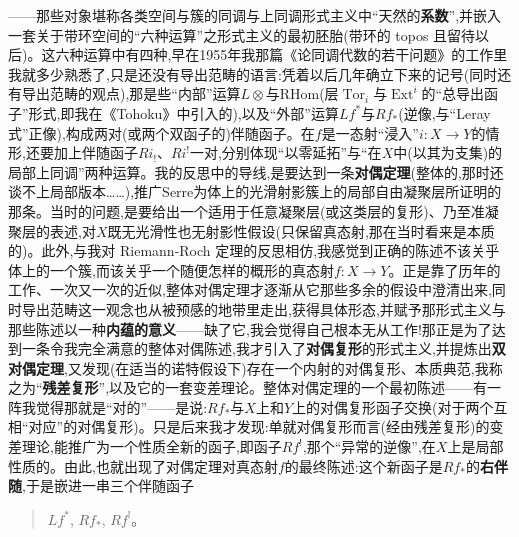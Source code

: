 ——那些对象堪称各类空间与簇的同调与上同调形式主义中“天然的\textbf{系数}”,并嵌入一套关于带环空间的“六种运算”之形式主义的最初胚胎(带环的 topos 且留待以后)。这六种运算中有四种,早在1955年我那篇《论同调代数的若干问题》的工作里我就多少熟悉了,只是还没有导出范畴的语言:凭着以后几年确立下来的记号(同时还有导出范畴的观点),那是些“内部”运算$L\otimes$与$\mathrm{RHom}$(层$\operatorname{Tor}_i$与$\operatorname{Ext}^i$的“总导出函子”形式,即我在《Tohoku》中引入的),以及“外部”运算$Lf^*$与$Rf_*$(逆像,与“Leray式”正像),构成两对(或两个双函子的)伴随函子。在$f$是一态射“浸入”$i:X\to Y$的情形,还要加上伴随函子$Ri_!$、$Ri^!$一对,分别体现“以零延拓”与“在$X$中(以其为支集)的局部上同调”两种运算。我的反思中的导线,是要达到一条\textbf{对偶定理}(整体的,那时还谈不上局部版本……),推广Serre为体上的光滑射影簇上的局部自由凝聚层所证明的那条。当时的问题,是要给出一个适用于任意凝聚层(或这类层的复形)、乃至准凝聚层的表述,对$X$既无光滑性也无射影性假设(只保留真态射,那在当时看来是本质的)。此外,与我对 Riemann-Roch 定理的反思相仿,我感觉到正确的陈述不该关乎体上的一个簇,而该关乎一个随便怎样的概形的真态射$f:X\to Y$。正是靠了历年的工作、一次又一次的\dmark{}近似,整体对偶定理才逐渐从它那些多余的假设中澄清出来,同时导出范畴这一观念也从被预感的地带里走出,获得具体形态,并赋予那形式主义与那些陈述以一种\textbf{内蕴的意义}——缺了它,我会觉得自己根本无从工作!那正是为了达到一条令我完全满意的整体对偶陈述,我才引入了\textbf{对偶复形}的形式主义,并提炼出\textbf{双对偶定理},又发现(在适当的诺特假设下)存在一个内射的对偶复形、本质典范,我称之为“\textbf{残差复形}”,以及它的一套变差理论。整体对偶定理的一个最初陈述——有一阵我觉得那就是“对的”——是说:$Rf_*$与$X$上和$Y$上的对偶复形函子交换(对于两个互相“对应”的对偶复形)。只是后来我才发现:单就对偶复形而言(经由残差复形)的变差理论,能推广为一个性质全新的函子,即函子$Rf^!$,那个“异常的逆像”,在$X$上是局部性质的。由此,也就出现了对偶定理对真态射$f$的最终陈述:这个新函子是$Rf_*$的\textbf{右伴随},于是嵌进一串三个伴随函子

\begin{quote}
$Lf^*$, \quad $Rf_*$, \quad $Rf^!$。
\end{quote}

